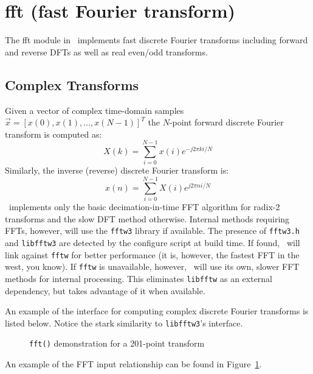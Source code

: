 % 
%

\newpage
\section{fft (fast Fourier transform)}
\label{module:fft}
%
The fft module in \liquid\ implements fast discrete Fourier transforms
including forward and reverse DFTs as well as real even/odd transforms.

\subsection{Complex Transforms}
\label{module:fft:dft}
Given a vector of complex time-domain samples
$\vec{x} = \left[x(0),x(1),\ldots,x(N-1)\right]^T$
the $N$-point forward discrete Fourier transform is computed as:
%
\begin{equation}
\label{eqn:fft:dft}
    X(k) = \sum_{i=0}^{N-1}{x(i) e^{-j 2 \pi k i/N}}
\end{equation}
%
Similarly, the inverse (reverse) discrete Fourier transform is:
\begin{equation}
\label{eqn:fft:idft}
    x(n) = \sum_{i=0}^{N-1}{X(i) e^{ j 2 \pi n i/N}}
\end{equation}
%
\liquid\ implements only the basic decimation-in-time FFT algorithm for
radix-2 transforms and the slow DFT method otherwise.
Internal methods requiring FFTs, however, will use the {\tt fftw3}
library \cite{fftw:web} if available.
The presence of {\tt fftw3.h} and {\tt libfftw3} are detected by the
configure script at build time.
If found, \liquid\ will link against {\tt fftw} for better performance
(it is, however, the fastest FFT in the west, you know).
If {\tt fftw} is unavailable, however, \liquid\ will use its own, slower
FFT methods for internal processing.
This eliminates {\tt libfftw} as an external dependency, but takes
advantage of it when available.

An example of the interface for computing complex discrete Fourier
transforms is listed below.
Notice the stark similarity to {\tt libfftw3}'s interface.
%

%
\begin{figure}
\centering
{}
\caption{{\tt fft()} demonstration for a 201-point transform}
\label{fig:module:fft}
\end{figure}
%
An example of the FFT input relationship can be
found in Figure~\ref{fig:module:fft}.

